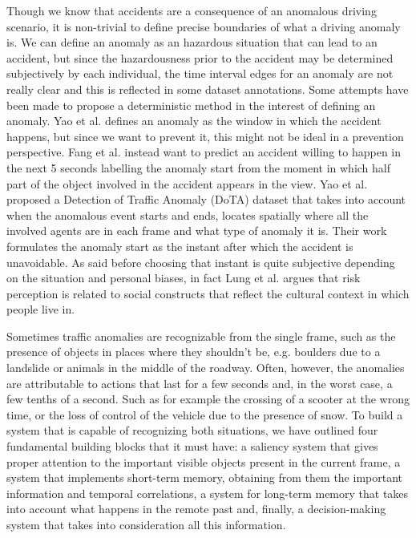 Though we know that accidents are a consequence of an anomalous driving scenario, it is non-trivial to define precise boundaries of what a driving anomaly is.
We can define an anomaly as an hazardous situation that can lead to an accident, but since the hazardousness prior to the accident may be determined subjectively by each individual, the time interval edges for an anomaly are not really clear and this is reflected in some dataset annotations.
Some attempts have been made to propose a deterministic method in the interest of defining an anomaly.
Yao et al. \cite{yao2019unsupervised} defines an anomaly as the window in which the accident happens, but since we want to prevent it, this might not be ideal in a prevention perspective. 
Fang et al. \cite{fang2019dada} instead want to predict an accident willing to happen in the next 5 seconds labelling the anomaly start from the moment in which half part of the object involved in the accident appears in the view.
Yao et al. \cite{yao2020when} proposed a Detection of Traffic Anomaly (DoTA) dataset that takes into account when the anomalous event starts and ends, locates spatially where all the involved agents are in each frame and what type of anomaly it is.
Their work formulates the anomaly start as the instant after which the accident is unavoidable.
As said before choosing that instant is quite subjective depending on the situation and personal biases, in fact Lung et al. \cite{lund2009riskperception} argues that risk perception is related to social constructs that reflect the cultural context in which people live in.

Sometimes traffic anomalies are recognizable from the single frame, such as the presence of objects in places where they shouldn't be, e.g. boulders due to a landslide or animals in the middle of the roadway.
Often, however, the anomalies are attributable to actions that last for a few seconds and, in the worst case, a few tenths of a second.
Such as for example the crossing of a scooter at the wrong time, or the loss of control of the vehicle due to the presence of snow.
To build a system that is capable of recognizing both situations, we have outlined four fundamental building blocks that it must have: a saliency system that gives proper attention to the important visible objects present in the current frame, a system that implements short-term memory, obtaining from them the important information and temporal correlations, a system for long-term memory that takes into account what happens in the remote past and, finally, a decision-making system that takes into consideration all this information.

